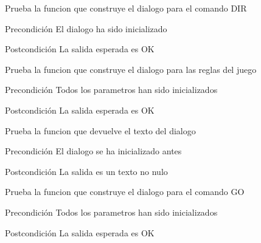 \begin{DoxyRefList}
\item[\label{test__test000028}%
\hypertarget{test__test000028}{}%
Global \hyperlink{dialogue__test_8c_a2f2e2e98bdec7f84bfd0bf0deafa47ee}{test1\-\_\-dialogue\-\_\-dir} ()]Prueba la funcion que construye el dialogo para el comando D\-I\-R \begin{DoxyPrecond}{Precondición}
El dialogo ha sido inicializado 
\end{DoxyPrecond}
\begin{DoxyPostcond}{Postcondición}
La salida esperada es O\-K  
\end{DoxyPostcond}

\item[\label{test__test000050}%
\hypertarget{test__test000050}{}%
Global \hyperlink{dialogue__test_8c_a70481672cf53ad95dd3477f36eba3826}{test1\-\_\-dialogue\-\_\-game\-\_\-rule} ()]Prueba la funcion que construye el dialogo para las reglas del juego \begin{DoxyPrecond}{Precondición}
Todos los parametros han sido inicializados 
\end{DoxyPrecond}
\begin{DoxyPostcond}{Postcondición}
La salida esperada es O\-K  
\end{DoxyPostcond}

\item[\label{test__test000022}%
\hypertarget{test__test000022}{}%
Global \hyperlink{dialogue__test_8c_a3abd9dce3db2aafec13df6afaf9af52a}{test1\-\_\-dialogue\-\_\-get\-\_\-text} ()]Prueba la funcion que devuelve el texto del dialogo \begin{DoxyPrecond}{Precondición}
El dialogo se ha inicializado antes 
\end{DoxyPrecond}
\begin{DoxyPostcond}{Postcondición}
La salida es un texto no nulo  
\end{DoxyPostcond}

\item[\label{test__test000024}%
\hypertarget{test__test000024}{}%
Global \hyperlink{dialogue__test_8c_ac9b03512a8026b6732351e36b167c3c3}{test1\-\_\-dialogue\-\_\-go} ()]Prueba la funcion que construye el dialogo para el comando G\-O \begin{DoxyPrecond}{Precondición}
Todos los parametros han sido inicializados 
\end{DoxyPrecond}
\begin{DoxyPostcond}{Postcondición}
La salida esperada es O\-K  
\end{DoxyPostcond}


\end{DoxyRefList}
